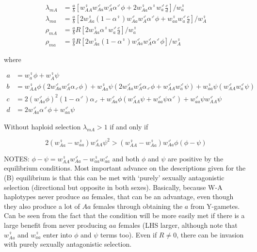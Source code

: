 \documentclass[12pt]{article}
\begin{document}
\begin{subequations}\label{Ainvasion}
\begin{align}
\lambda_{mA}&= \frac{a}{b} \left[w_{AA}^\female w_{Aa}^\male w_A^\male \alpha^\male \phi + 2 w_{Aa}^\female \alpha^\female w_a^\male \frac{c}{d}\right] / w_a^\female \\
\lambda_{ma}&= \frac{a}{b} \left[2 w_{Aa}^\female (1-\alpha^\female) w_{Aa}^\male w_A^\male \alpha^\male \phi+  w_{aa}^\female w_a^\male \frac{c}{d}\right] / w_A^\female \\
\rho_{mA}&= \frac{a}{b} R \left[ 2 w_{Aa}^\female \alpha^\female w_a^\male \frac{c}{d} \right] / w_a^\female\\ 
\rho_{ma}&= \frac{a}{b} R \left[ 2 w_{Aa}^\female (1-\alpha^\female) w_{Aa}^\male w_A^\male \alpha^\male \phi \right] / w_A^\female
\end{align}
\end{subequations}

\noindent
where 

\begin{subequations}
\begin{align}
a &= w_a^\female \phi + w_A^\female \psi \\
b &= w_{AA}^\female \phi (2 w_{Aa}^\male w_A^\male \alpha_\male \phi) + w_{Aa}^\female \psi (2 w_{Aa}^\male w_A^\male \alpha_\male \phi + w_{AA}^\male w_a^\male \psi) + w_{aa}^\female \psi(w_{AA}^\male w_a^\male \psi) \\
c &= 2(w_{Aa}^\male\phi)^2(1-\alpha^\male)\alpha_\male + w_{Aa}^\male\phi(w_{AA}^\male \psi + w_{aa}^\male \psi \alpha^\male) + w_{aa}^\male \psi w_{AA}^\male \psi \\
d &= 2 w_{Aa}^\male \alpha^\male \phi + w_{aa}^\male \psi
\end{align}
\end{subequations}

\noindent
Without haploid selection $\lambda_{mA}>1$ if and only if

\begin{equation}
2(w_{Aa}^\female-w_{aa}^\female)w_{AA}^\male \psi^2 > (w_{AA}^\female-w_{Aa}^\female)w_{Aa}^\male \phi (\phi-\psi)
\end{equation}

\noindent
NOTES:  
$\phi-\psi=w_{AA}^\female w_{Aa}^\male-w_{aa}^\female w_{aa}^\male$ and both $\phi$ and $\psi$ are positive by the equilibrium conditions. 
Most important advance on the descriptions given for the (B) equilibrium is that this can be met with `purely' sexually antagonistic selection (directional but opposite in both sexes). 
Basically, because W-A haplotypes never produce $aa$ females, that can be an advantage, even though they also produce a lot of $Aa$ females through obtaining the $a$ from Y-gametes. 
Can be seen from the fact that the condition will be more easily met if there is a large benefit from never producing $aa$ females (LHS larger, although note that $w_{Aa}^\female$ and $w_{aa}^\female$ enter into $\phi$ and $\psi$ terms too). 
Even if $R\neq 0$, there can be invasion with purely sexually antagonistic selection. 
\end{document}
